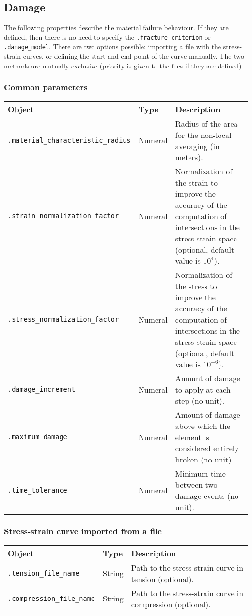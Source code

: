 \documentclass[10pt]{article}
\begin{document}
\subsection{Damage}

The following properties describe the material failure behaviour. If they are defined, then there is no need to specify the \verb+.fracture_criterion+ or \verb+.damage_model+. There are two options possible: importing a file with the stress-strain curves, or defining the start and end point of the curve manually. The two methods are mutually exclusive (priority is given to the files if they are defined).

\subsubsection*{Common parameters}

\begin{tabularx}{\textwidth}{llX}
\hline 
Object & Type & Description \\ 
\hline 
\verb+.material_characteristic_radius+ & Numeral & Radius of the area for the non-local averaging (in meters).\\
\verb+.strain_normalization_factor+ & Numeral & Normalization of the strain to improve the accuracy of the computation of intersections in the stress-strain space (optional, default value is $10^4$).\\
\verb+.stress_normalization_factor+ & Numeral & Normalization of the stress to improve the accuracy of the computation of intersections in the stress-strain space (optional, default value is $10^{-6}$).\\
\verb+.damage_increment+ & Numeral & Amount of damage to apply at each step (no unit).\\
\verb+.maximum_damage+ & Numeral & Amount of damage above which the element is considered entirely broken (no unit).\\
\verb+.time_tolerance+ & Numeral & Minimum time between two damage events (no unit).\\
\hline 
\end{tabularx}

\subsubsection*{Stress-strain curve imported from a file}

\begin{tabularx}{\textwidth}{llX}
\hline 
Object & Type & Description \\ 
\hline 
\verb+.tension_file_name+ & String & Path to the stress-strain curve in tension (optional).\\
\verb+.compression_file_name+ & String & Path to the stress-strain curve in compression (optional).\\
\hline 
\end{tabularx}
\end{document}
